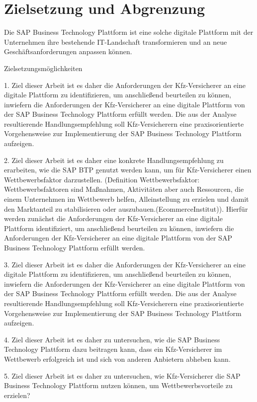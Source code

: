 \section{Zielsetzung und Abgrenzung}

Die SAP Business Technology Plattform ist eine solche digitale Plattform mit der Unternehmen ihre bestehende IT-Landschaft transformieren und an neue Geschäftsanforderungen anpassen können.

Zielsetzungsmöglichkeiten

1. Ziel dieser Arbeit ist es daher die Anforderungen der Kfz-Versicherer an eine digitale Plattform zu identifizieren, um anschließend beurteilen zu können, inwiefern die Anforderungen der Kfz-Versicherer an eine digitale Plattform von der SAP Business Technology Plattform erfüllt werden. Die aus der Analyse resultierende Handlungsempfehlung soll Kfz-Versicherern eine praxisorientierte Vorgehensweise zur Implementierung der SAP Business Technology Plattform aufzeigen.

2. Ziel dieser Arbeit ist es daher eine konkrete Handlungsempfehlung zu erarbeiten, wie die SAP BTP genutzt werden kann, um für Kfz-Versicherer einen Wettbewerbsfaktor darzustellen. (Definition Wettbewerbsfaktor: Wettbewerbsfaktoren sind Maßnahmen, Aktivitäten aber auch Ressourcen, die einem Unternehmen im Wettbewerb helfen, Alleinstellung zu erzielen und damit den Marktanteil zu stabilisieren oder auszubauen.(EcommerceInstitut)). Hierfür werden zunächst die Anforderungen der Kfz-Versicherer an eine digitale Plattform identifiziert, um anschließend beurteilen zu können, inwiefern die Anforderungen der Kfz-Versicherer an eine digitale Plattform von der SAP Business Technology Plattform erfüllt werden.

3. Ziel dieser Arbeit ist es daher die Anforderungen der Kfz-Versicherer an eine digitale Plattform zu identifizieren, um anschließend beurteilen zu können, inwiefern die Anforderungen der Kfz-Versicherer an eine digitale Plattform von der SAP Business Technology Plattform erfüllt werden. Die aus der Analyse resultierende Handlungsempfehlung soll Kfz-Versicherern eine praxisorientierte Vorgehensweise zur Implementierung der SAP Business Technology Plattform aufzeigen.

4. Ziel dieser Arbeit ist es daher zu untersuchen, wie die SAP Business Technology Plattform dazu beitragen kann, dass ein Kfz-Versicherer im Wettbewerb erfolgreich ist und sich von anderen Anbietern abheben kann.

5. Ziel dieser Arbeit ist es daher zu untersuchen, wie Kfz-Versicherer die SAP Business Technology Plattform nutzen können, um Wettbewerbsvorteile zu erzielen?


